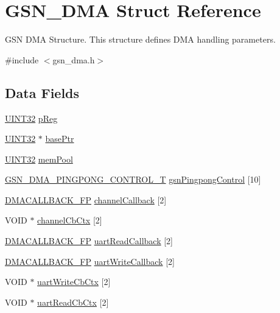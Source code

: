 \hypertarget{a00049}{
\section{GSN\_\-DMA Struct Reference}
\label{a00049}
}


GSN DMA Structure. This structure defines DMA handling parameters.  




{\ttfamily \#include $<$gsn\_\-dma.h$>$}

\subsection*{Data Fields}
\begin{DoxyCompactItemize}
\item 
\hyperlink{a00660_gae1e6edbbc26d6fbc71a90190d0266018}{UINT32} \hyperlink{a00049_a733fb7afbc3bd37a546de0e37c12f150}{pReg}
\item 
\hyperlink{a00660_gae1e6edbbc26d6fbc71a90190d0266018}{UINT32} $\ast$ \hyperlink{a00049_aec2f3ffcdad505b0a8d4a1f16e30849b}{basePtr}
\item 
\hyperlink{a00660_gae1e6edbbc26d6fbc71a90190d0266018}{UINT32} \hyperlink{a00049_a942be9a68f7697a36a6c971081311d12}{memPool}
\item 
\hyperlink{a00051}{GSN\_\-DMA\_\-PINGPONG\_\-CONTROL\_\-T} \hyperlink{a00049_a12a87a72a8c4742ea0b7fac38996d3f7}{gsnPingpongControl} \mbox{[}10\mbox{]}
\item 
\hyperlink{a00484_a74d23c3cb3acf00134600795aef55b6e}{DMACALLBACK\_\-FP} \hyperlink{a00049_a87bff44e43568a32d78369cdd2ebb49e}{channelCallback} \mbox{[}2\mbox{]}
\item 
VOID $\ast$ \hyperlink{a00049_a75f196cea4b3c0868b5580fa92a8ad5f}{channelCbCtx} \mbox{[}2\mbox{]}
\item 
\hyperlink{a00484_a74d23c3cb3acf00134600795aef55b6e}{DMACALLBACK\_\-FP} \hyperlink{a00049_a80249bc0f9f4b2856087049f02d7d3df}{uartReadCallback} \mbox{[}2\mbox{]}
\item 
\hyperlink{a00484_a74d23c3cb3acf00134600795aef55b6e}{DMACALLBACK\_\-FP} \hyperlink{a00049_aa0d74b7ef433fb195c209bb0de4c8fae}{uartWriteCallback} \mbox{[}2\mbox{]}
\item 
VOID $\ast$ \hyperlink{a00049_afe05e53d420651ba7555e8db0398b772}{uartWriteCbCtx} \mbox{[}2\mbox{]}
\item 
VOID $\ast$ \hyperlink{a00049_a814c350b43f8f659c433aaaac04a2d84}{uartReadCbCtx} \mbox{[}2\mbox{]}
\item 

\end{DoxyCompactItemize}

